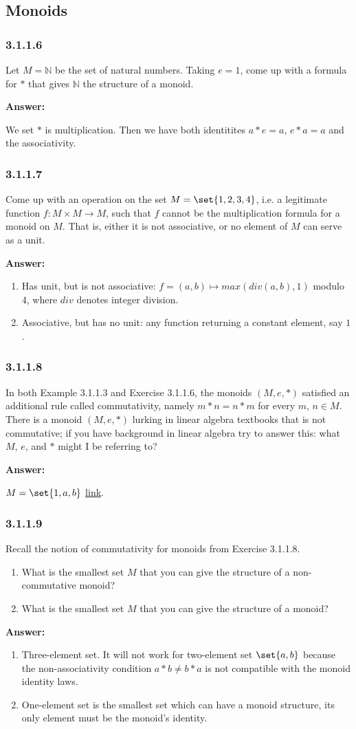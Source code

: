\documentclass{article}
\newcommand{\N}{\mathbb{N}}
\newcommand{\vsp}[0]{\vspace*{10pt}\par}
\newcommand{\exercise}[1]{\subsubsection*{#1}}
\newcommand{\ans}[0]{\vsp\textbf{Answer: }\vsp}
\newcommand{\ei}{\item}
\newcommand{\es}{\begin{enumerate}[label=(\alph*)]\ei}
\newcommand{\ee}{\end{enumerate}}
\begin{document}
\subsection{Monoids}

\exercise{3.1.1.6}

Let $M = \N$ be the set of natural numbers. Taking $e = 1$, come up with a
formula for $*$ that gives $\N$ the structure of a monoid.

\ans

We set $*$ is multiplication. Then we have both identitites $a*e = a$, $e*a = a$
and the associativity.


\exercise{3.1.1.7}

Come up with an operation on the set $M = \set{1, 2, 3, 4}$, i.e. a legitimate
function $f : M \times M \to M$, such that $f$ cannot be the multiplication
formula for a monoid on $M$. That is, either it is not associative, or no
element of $M$ can serve as a unit.

\ans

\es Has unit, but is not associative: $f = (a,b) \mapsto max(div(a,b), 1)$
    modulo $4$, where $div$ denotes integer division.
\ei Associative, but has no unit: any function returning a constant element, say
    $1$.
\ee

\exercise{3.1.1.8}

In both Example 3.1.1.3 and Exercise 3.1.1.6, the monoids $(M, e, *)$ satisfied
an additional rule called commutativity, namely $m*n = n*m$ for every $m$, $n
\in M$.  There is a monoid $(M, e, *)$ lurking in linear algebra textbooks that
is not commutative; if you have background in linear algebra try to answer this:
what $M$, $e$, and $*$ might I be referring to?

\ans

$M = \set{1,a,b}$ \href{https://math.stackexchange.com/a/207813/374432}{link}.

\exercise{3.1.1.9}

Recall the notion of commutativity for monoids from Exercise 3.1.1.8.

\es What is the smallest set $M$ that you can give the structure of a
    non-commutative monoid?
\ei What is the smallest set $M$ that you can give the structure of a monoid?
\ee

\ans

\es Three-element set. It will not work for two-element set $\set{a,b}$ because
    the non-associativity condition $a*b \ne b*a$ is not compatible with the
    monoid identity laws.
\ei One-element set is the smallest set which can have a monoid structure, its
    only element must be the monoid's identity.
\ee
\end{document}
